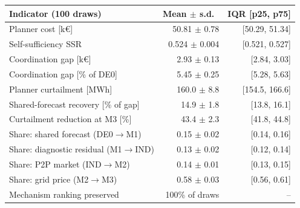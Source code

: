 \begin{tabular*}{\textwidth}{@{\extracolsep{\fill}}lrr@{}}
\toprule
Indicator (100 draws) & Mean $\pm$ s.d.\ & IQR [p25, p75] \\
\midrule
Planner cost [k\euro] & 50.81 $\pm$ 0.78 & [50.29, 51.34] \\
Self-sufficiency SSR & 0.524 $\pm$ 0.004 & [0.521, 0.527] \\
Coordination gap [k\euro] & 2.93 $\pm$ 0.13 & [2.84, 3.03] \\
Coordination gap [\% of DE0] & 5.45 $\pm$ 0.25 & [5.28, 5.63] \\
Planner curtailment [MWh] & 160.0 $\pm$ 8.8 & [154.5, 166.6] \\
Shared-forecast recovery [\% of gap] & 14.9 $\pm$ 1.8 & [13.8, 16.1] \\
Curtailment reduction at M3 [\%] & 43.4 $\pm$ 2.3 & [41.8, 44.8] \\
Share: shared forecast (DE0$\to$M1) & 0.15 $\pm$ 0.02 & [0.14, 0.16] \\
Share: diagnostic residual (M1$\to$IND) & 0.13 $\pm$ 0.02 & [0.12, 0.14] \\
Share: P2P market (IND$\to$M2) & 0.14 $\pm$ 0.01 & [0.13, 0.15] \\
Share: grid price (M2$\to$M3) & 0.58 $\pm$ 0.03 & [0.56, 0.61] \\
\midrule
Mechanism ranking preserved & 100\% of draws & -- \\
\bottomrule
\end{tabular*}
